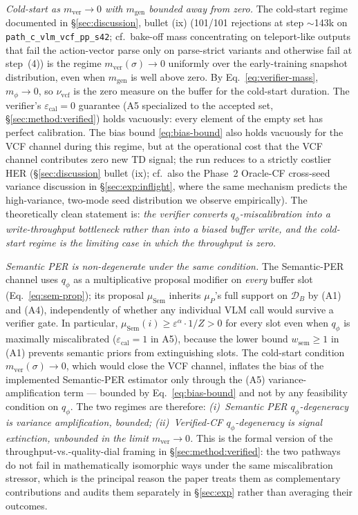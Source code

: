 \emph{Cold-start as $m_{\text{ver}}\!\to\!0$ with $m_{\text{gen}}$ bounded away from zero.}
The cold-start regime documented in \S\ref{sec:discussion}, bullet (ix)
(101/101 rejections at step $\sim$143k on
\texttt{path\_c\_vlm\_vcf\_pp\_s42}; cf.\ bake-off mass concentrating
on teleport-like outputs that fail the action-vector parse only on
parse-strict variants and otherwise fail at step~(4)) is the regime
$m_{\text{ver}}(\sigma)\!\to\!0$ uniformly over the early-training
snapshot distribution, even when $m_{\text{gen}}$ is well above zero.
By Eq.~\eqref{eq:verifier-mass}, $m_\phi\!\to\!0$, so
$\nu_{\text{vcf}}$ is the zero measure on the buffer for the cold-start
duration. The verifier's $\varepsilon_{\text{cal}}\!=\!0$ guarantee
(A5 specialized to the accepted set, \S\ref{sec:method:verified})
holds vacuously: every element of the empty set has perfect
calibration. The bias bound \eqref{eq:bias-bound} also holds
vacuously for the VCF channel during this regime, but at the
operational cost that the VCF channel contributes zero new TD signal;
the run reduces to a strictly costlier HER (\S\ref{sec:discussion}
bullet (ix); cf.\ also the Phase~2 Oracle-CF cross-seed variance
discussion in \S\ref{sec:exp:inflight}, where the same mechanism
predicts the high-variance, two-mode seed distribution we observe
empirically). The theoretically clean statement is:
\emph{the verifier converts $q_\phi$-miscalibration into a
write-throughput bottleneck rather than into a biased buffer write,
and the cold-start regime is the limiting case in which the
throughput is zero.}

\emph{Semantic PER is non-degenerate under the same condition.}
The Semantic-PER channel uses $q_\phi$ as a multiplicative
proposal modifier on \emph{every} buffer slot
(Eq.~\eqref{eq:sem-prop}); its proposal $\mu_{\text{Sem}}$ inherits
$\mu_P$'s full support on $\mathcal{D}_B$ by (A1) and (A4), independently
of whether any individual VLM call would survive a verifier gate. In
particular, $\mu_{\text{Sem}}(i)\ge\varepsilon^\alpha\!\cdot\!1/Z\!>\!0$
for every slot even when $q_\phi$ is maximally miscalibrated
($\varepsilon_{\text{cal}}\!=\!1$ in A5), because the lower bound
$w_{\text{sem}}\!\ge\!1$ in (A1) prevents semantic priors from
extinguishing slots. The cold-start condition
$m_{\text{ver}}(\sigma)\!\to\!0$, which would close the VCF channel,
inflates the bias of the implemented Semantic-PER estimator only
through the (A5) variance-amplification term --- bounded by
Eq.~\eqref{eq:bias-bound} and not by any feasibility condition on
$q_\phi$. The two regimes are therefore: \emph{(i)~Semantic PER
$q_\phi$-degeneracy is variance amplification, bounded;
(ii)~Verified-CF $q_\phi$-degeneracy is signal extinction,
unbounded in the limit $m_{\text{ver}}\!\to\!0$.} This is the
formal version of the throughput-vs.-quality-dial framing in
\S\ref{sec:method:verified}: the two pathways do not fail in
mathematically isomorphic ways under the same miscalibration
stressor, which is the principal reason the paper treats them as
complementary contributions and audits them separately in
\S\ref{sec:exp} rather than averaging their outcomes.


